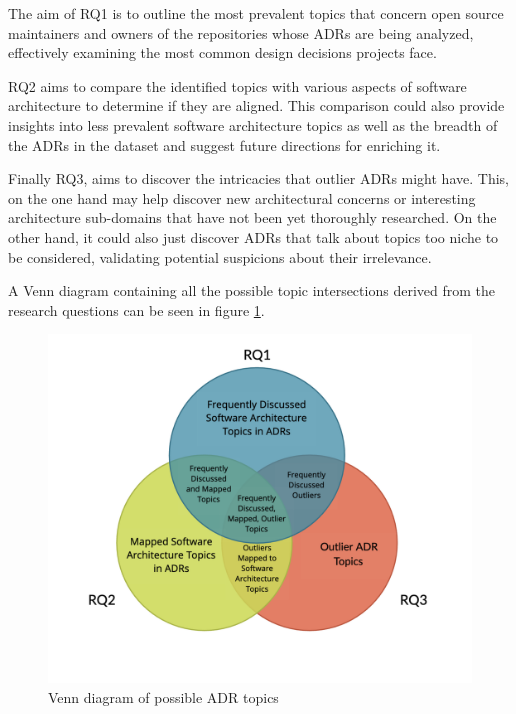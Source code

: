     The aim of RQ1 is to outline the most prevalent topics that concern open source maintainers and owners of the repositories whose ADRs are being analyzed, effectively examining the most common design decisions projects face.
    
    RQ2 aims to compare the identified topics with various aspects of software architecture to determine if they are aligned. This comparison could also provide insights into less prevalent software architecture topics as well as the breadth of the ADRs in the dataset and suggest future directions for enriching it.
    
    Finally RQ3, aims to discover the intricacies that outlier ADRs might have. This, on the one hand may help discover new architectural concerns or interesting architecture sub-domains that have not been yet thoroughly researched. On the other hand, it could also just discover ADRs that talk about topics too niche to be considered, validating potential suspicions about their irrelevance.

    A Venn diagram containing all the possible topic intersections derived from the research questions can be seen in figure \ref{fig:RQ_Venn}.

    \begin{figure}[h]
        \centering
        \includegraphics[width=\textwidth]{figures/RQ_VADR_VENN_WHITE.png}
        \caption{Venn diagram of possible ADR topics}
        \label{fig:RQ_Venn}
    \end{figure}        

